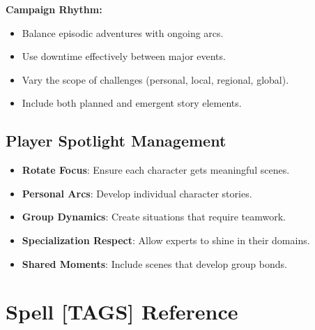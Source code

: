 \textbf{Campaign Rhythm:}
\begin{itemize}
\item Balance episodic adventures with ongoing arcs.
\item Use downtime effectively between major events.
\item Vary the scope of challenges (personal, local, regional, global).
\item Include both planned and emergent story elements.
\end{itemize}

\subsection{Player Spotlight Management}
\label{subsec:spotlight-management}

\begin{itemize}
\item \textbf{Rotate Focus}: Ensure each character gets meaningful scenes.
\item \textbf{Personal Arcs}: Develop individual character stories.
\item \textbf{Group Dynamics}: Create situations that require teamwork.
\item \textbf{Specialization Respect}: Allow experts to shine in their domains.
\item \textbf{Shared Moments}: Include scenes that develop group bonds.
\end{itemize}

\clearpage

\section*{Spell [TAGS] Reference}
\label{sec:spell-tags}

\setlength{\LTpre}{6pt}
\setlength{\LTpost}{6pt}
\renewcommand{\arraystretch}{1.08}

